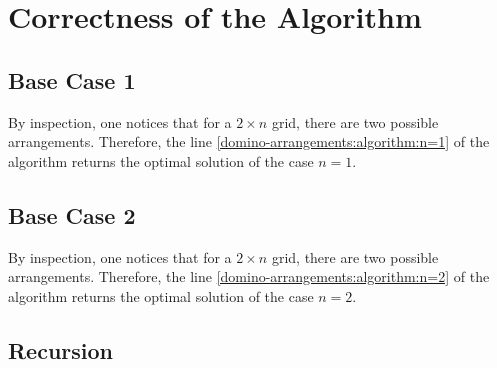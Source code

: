 \begin{algorithm}[H]
    \caption{\DA}
    \label{domino-arrangements:algorithm}
    \begin{algorithmic}[1]
            \label{domino-arrangements:algorithm:n=1}
        \Else
        \EndIf
    \end{algorithmic}
\end{algorithm}

\section{Correctness of the Algorithm}

\subsection*{Base Case 1}

By inspection, one notices that for a $2 \times n$ grid, there are two possible arrangements. Therefore, the line \ref{domino-arrangements:algorithm:n=1} of the algorithm returns the optimal solution of the case $n = 1$.

\subsection*{Base Case 2}

By inspection, one notices that for a $2 \times n$ grid, there are two possible arrangements. Therefore, the line \ref{domino-arrangements:algorithm:n=2} of the algorithm returns the optimal solution of the case $n = 2$.

\subsection*{Recursion}

